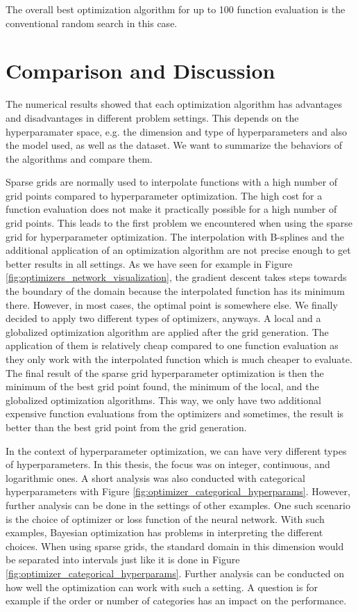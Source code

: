 The overall best optimization algorithm for up to 100 function evaluation is the conventional random search in this case. 

\section{Comparison and Discussion}

The numerical results showed that each optimization algorithm has advantages and disadvantages in different problem settings. This depends on the hyperparamater space, e.g. the dimension and type of hyperparameters and also the model used, as well as the dataset. We want to summarize the behaviors of the algorithms and compare them. \newline 

Sparse grids are normally used to interpolate functions with a high number of grid points compared to hyperparameter optimization. The high cost for a function evaluation does not make it practically possible for a high number of grid points. This leads to the first problem we encountered when using the sparse grid for hyperparameter optimization. The interpolation with B-splines and the additional application of an optimization algorithm are not precise enough to get better results in all settings. As we have seen for example in Figure \ref{fig:optimizers_network_visualization}, the gradient descent takes steps towards the boundary of the domain because the interpolated function has its minimum there. However, in most cases, the optimal point is somewhere else. We finally decided to apply two different types of optimizers, anyways. A local and a globalized optimization algorithm are applied after the grid generation. The application of them is relatively cheap compared to one function evaluation as they only work with the interpolated function which is much cheaper to evaluate. The final result of the sparse grid hyperparameter optimization is then the minimum of the best grid point found, the minimum of the local, and the globalized optimization algorithms. This way, we only have two additional expensive function evaluations from the optimizers and sometimes, the result is better than the best grid point from the grid generation.

In the context of hyperparameter optimization, we can have very different types of hyperparameters. In this thesis, the focus was on integer, continuous, and logarithmic ones. A short analysis was also conducted with categorical hyperparameters with Figure \ref{fig:optimizer_categorical_hyperparams}. However, further analysis can be done in the settings of other examples. One such scenario is the choice of optimizer or loss function of the neural network. With such examples, Bayesian optimization has problems in interpreting the different choices. When using sparse grids, the standard domain in this dimension would be separated into intervals just like it is done in Figure \ref{fig:optimizer_categorical_hyperparams}. Further analysis can be conducted on how well the optimization can work with such a setting. A question is for example if the order or number of categories has an impact on the performance. 


